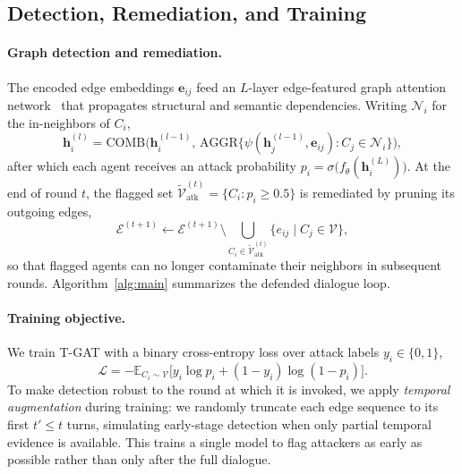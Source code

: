 \subsection{Detection, Remediation, and Training}
\label{sec:method_train}

\paragraph{Graph detection and remediation.}
The encoded edge embeddings $\mathbf{e}_{ij}$ feed an $L$-layer edge-featured graph
attention network~\citep{velickovic2018gat} that propagates structural and
semantic dependencies. Writing $\mathcal{N}_i$ for the in-neighbors of $C_i$,
\begin{equation}
\mathbf{h}_i^{(l)}=\mathrm{COMB}\!\Big(\mathbf{h}_i^{(l-1)},\,
\mathrm{AGGR}\big\{\psi(\mathbf{h}_j^{(l-1)},\mathbf{e}_{ij}):
C_j\in\mathcal{N}_i\big\}\Big),
\end{equation}
after which each agent receives an attack probability
$p_i=\sigma\!\big(f_\theta(\mathbf{h}_i^{(L)})\big)$. At the end of round $t$, the
flagged set $\tilde{\mathcal{V}}_{\text{atk}}^{(t)}=\{C_i:p_i\ge 0.5\}$ is remediated
by pruning its outgoing edges,
\begin{equation}
\label{eq:prune}
\mathcal{E}^{(t+1)}\leftarrow\mathcal{E}^{(t+1)}\setminus
\bigcup_{C_i\in\tilde{\mathcal{V}}_{\text{atk}}^{(t)}}
\{e_{ij}\mid C_j\in\mathcal{V}\},
\end{equation}
so that flagged agents can no longer contaminate their neighbors in subsequent
rounds. Algorithm~\ref{alg:main} summarizes the defended dialogue loop.

\paragraph{Training objective.}
We train T-GAT with a binary cross-entropy loss over attack labels
$y_i\in\{0,1\}$,
\begin{equation}
\label{eq:loss}
\mathcal{L}=-\mathbb{E}_{C_i\sim\mathcal{V}}\big[
y_i\log p_i+(1-y_i)\log(1-p_i)\big].
\end{equation}
To make detection robust to the round at which it is invoked, we apply
\emph{temporal augmentation} during training: we randomly truncate each edge
sequence to its first $t'\le t$ turns, simulating early-stage detection when only
partial temporal evidence is available. This trains a single model to flag
attackers as early as possible rather than only after the full dialogue.

